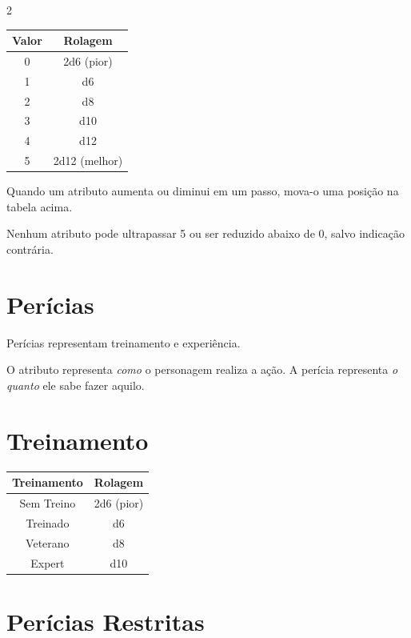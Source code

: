 \documentclass[a4paper,11pt,openany]{book}
\begin{document}
\begin{multicols}{2}
\begin{table}[H]
\centering
\sffamily
{}
\begin{tabular}{cc}
\toprule
\textbf{Valor} & \textbf{Rolagem} \\
\midrule
0 & 2d6 (pior) \\
1 & d6 \\
2 & d8 \\
3 & d10 \\
4 & d12 \\
5 & 2d12 (melhor) \\
\bottomrule
\end{tabular}
\end{table}

\begin{regra}
Quando um atributo aumenta ou diminui em um passo, mova-o uma posição na tabela acima.

Nenhum atributo pode ultrapassar 5 ou ser reduzido abaixo de 0, salvo indicação contrária.
\end{regra}

\section{Perícias}

Perícias representam treinamento e experiência.

O atributo representa \textit{como} o personagem realiza a ação. A perícia representa \textit{o quanto} ele sabe fazer aquilo.

\section{Treinamento}

\begin{table}[H]
\centering
\sffamily
{}
\begin{tabular}{cc}
\toprule
\textbf{Treinamento} & \textbf{Rolagem} \\
\midrule
Sem Treino & 2d6 (pior) \\
Treinado & d6 \\
Veterano & d8 \\
Expert & d10 \\
\bottomrule
\end{tabular}
\end{table}

\section{Perícias Restritas}


\end{multicols}
\end{document}

